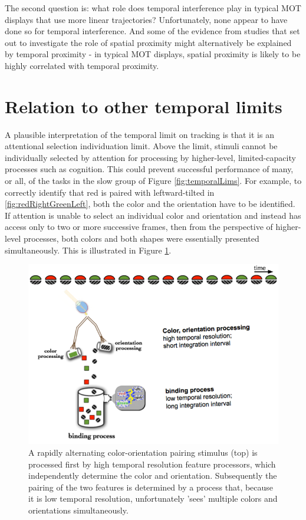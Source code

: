 \documentclass[
]{book}
\begin{document}
The second question is: what role does temporal interference play in typical MOT displays that use more linear trajectories? Unfortunately, none appear to have done so for temporal interference. And some of the evidence from studies that set out to investigate the role of spatial proximity might alternatively be explained by temporal proximity \citep[e.g.,][]{baeCloseEncountersDistracting2012}- in typical MOT displays, spatial proximity is likely to be highly correlated with temporal proximity.

\hypertarget{relation-to-other-temporal-limits}{%
\section{Relation to other temporal limits}\label{relation-to-other-temporal-limits}}

A plausible interpretation of the temporal limit on tracking is that it is an attentional selection individuation limit. Above the limit, stimuli cannot be individually selected by attention for processing by higher-level, limited-capacity processes such as cognition. This could prevent successful performance of many, or all, of the tasks in the slow group of Figure \ref{fig:temporalLims}. For example, to correctly identify that red is paired with leftward-tilted in \ref{fig:redRightGreenLeft}, both the color and the orientation have to be identified. If attention is unable to select an individual color and orientation and instead has access only to two or more successive frames, then from the perspective of higher-level processes, both colors and both shapes were essentially presented simultaneously. This is illustrated in Figure \ref{fig:temporalresolutionwaterworks}.

\begin{figure}
\includegraphics[width=0.8\linewidth]{imagesForRmd/temporalLimitsPerception/temporalresolutionwaterworks} \caption{A rapidly alternating color-orientation pairing stimulus (top) is processed first by high temporal resolution feature processors, which independently determine the color and orientation. Subsequently the pairing of the two features is determined by a process that, because it is low temporal resolution, unfortunately 'sees' multiple colors and orientations simultaneously.}\label{fig:temporalresolutionwaterworks}
\end{figure}
\end{document}
